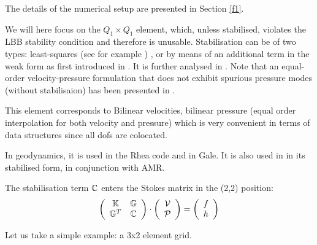 The details of the numerical setup are presented in Section \ref{f1}.

We will here focus on the $Q_1 \times Q_1$ element, which, unless stabilised,
violates  the LBB stability condition and therefore is unusable. 
Stabilisation can be of two types: least-squares (see for example \cite{dohu03}) 
\cite{temr92,kibr,gubl06},
or by means of an additional term in the weak form as first introduced in \cite{dobo04,bodg06}.
It is further analysed in \cite{nosi01,lihc09}.
Note that an equal-order velocity-pressure formulation that does not exhibit spurious
pressure modes (without stabilisaion) has been presented in \cite{risc86}.

This element corresponds to Bilinear velocities, bilinear pressure (equal order interpolation for both
velocity and pressure) which is very convenient in terms of data structures since all dofs 
are colocated.

In geodynamics, it is used in the Rhea code \cite{stgb10,busa13} and in Gale.
It is also used in \cite{lezh11} in its stabilised form, in conjunction with AMR. 

The stabilisation term ${\mathbb{C}}$ enters the Stokes matrix in the (2,2) position:
\[
\left(
\begin{array}{cc}
{\mathbb{K}} & {\mathbb{G}} \\ {\mathbb{G}}^T & {\mathbb{C}} 
\end{array}
\right)
\cdot
\left(
\begin{array}{c}
{\cal V} \\ {\cal P}
\end{array}
\right)
=
\left(
\begin{array}{c}
 f \\ h
\end{array}
\right)
\]

Let us take a simple example: a 3x2 element grid.

